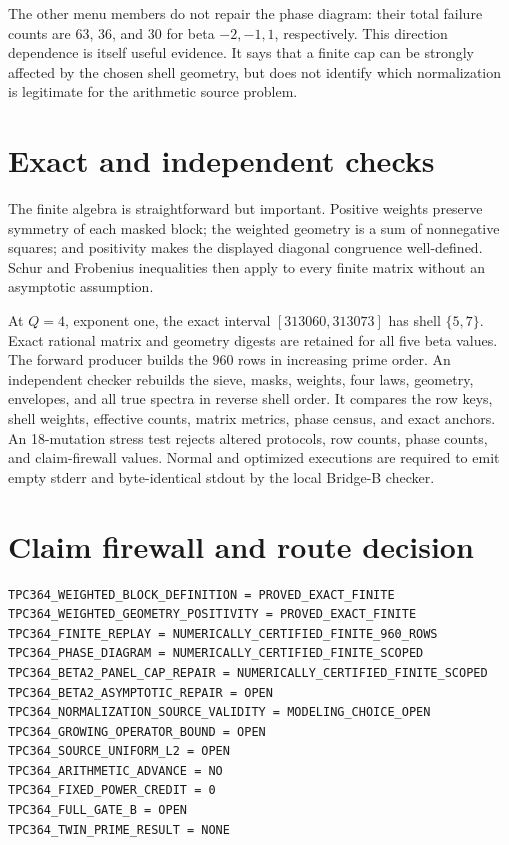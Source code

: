 \documentclass[10pt]{article}
\begin{document}
The other menu members do not repair the phase diagram: their total failure
counts are 63, 36, and 30 for beta $-2,-1,1$, respectively.  This direction
dependence is itself useful evidence.  It says that a finite cap can be
strongly affected by the chosen shell geometry, but does not identify which
normalization is legitimate for the arithmetic source problem.

\section{Exact and independent checks}

The finite algebra is straightforward but important.  Positive weights
preserve symmetry of each masked block; the weighted geometry is a sum of
nonnegative squares; and positivity makes the displayed diagonal congruence
well-defined.  Schur and Frobenius inequalities then apply to every finite
matrix without an asymptotic assumption.

At $Q=4$, exponent one, the exact interval $[313060,313073]$ has shell
$\{5,7\}$.  Exact rational matrix and geometry digests are retained for all
five beta values.  The forward producer builds the 960 rows in increasing
prime order.  An independent checker rebuilds the sieve, masks, weights,
four laws, geometry, envelopes, and all true spectra in reverse shell order.
It compares the row keys, shell weights, effective counts, matrix metrics,
phase census, and exact anchors.  An 18-mutation stress test rejects altered
protocols, row counts, phase counts, and claim-firewall values.  Normal and
optimized executions are required to emit empty stderr and byte-identical
stdout by the local Bridge-B checker.

\section{Claim firewall and route decision}

\begin{verbatim}
TPC364_WEIGHTED_BLOCK_DEFINITION = PROVED_EXACT_FINITE
TPC364_WEIGHTED_GEOMETRY_POSITIVITY = PROVED_EXACT_FINITE
TPC364_FINITE_REPLAY = NUMERICALLY_CERTIFIED_FINITE_960_ROWS
TPC364_PHASE_DIAGRAM = NUMERICALLY_CERTIFIED_FINITE_SCOPED
TPC364_BETA2_PANEL_CAP_REPAIR = NUMERICALLY_CERTIFIED_FINITE_SCOPED
TPC364_BETA2_ASYMPTOTIC_REPAIR = OPEN
TPC364_NORMALIZATION_SOURCE_VALIDITY = MODELING_CHOICE_OPEN
TPC364_GROWING_OPERATOR_BOUND = OPEN
TPC364_SOURCE_UNIFORM_L2 = OPEN
TPC364_ARITHMETIC_ADVANCE = NO
TPC364_FIXED_POWER_CREDIT = 0
TPC364_FULL_GATE_B = OPEN
TPC364_TWIN_PRIME_RESULT = NONE
\end{verbatim}
\end{document}
